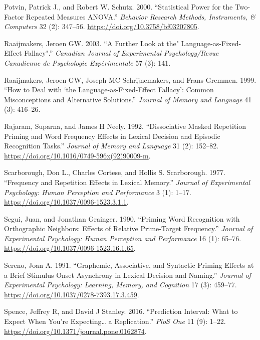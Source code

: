 \documentclass[
]{interact}
\newlength{\cslhangindent}
\newenvironment{CSLReferences}[2] %
 {\begin{list}{}{%
  \setlength{\itemindent}{0pt}
  \setlength{\leftmargin}{0pt}
  \setlength{\parsep}{0pt}
  \ifodd #1
   \setlength{\leftmargin}{\cslhangindent}
   \setlength{\itemindent}{-1\cslhangindent}
  \fi
  \setlength{\itemsep}{#2\baselineskip}}}
 {\end{list}}
\begin{document}
\begin{CSLReferences}{1}{0}
Potvin, Patrick J., and Robert W. Schutz. 2000. {``Statistical Power for
the Two-Factor Repeated Measures ANOVA.''} \emph{Behavior Research
Methods, Instruments, \& Computers} 32 (2): 347--56.
\url{https://doi.org/10.3758/bf03207805}.

Raaijmakers, Jeroen GW. 2003. {``A Further Look at the"
Language-as-Fixed-Effect Fallacy".''} \emph{Canadian Journal of
Experimental Psychology/Revue Canadienne de Psychologie Exp{é}rimentale}
57 (3): 141.

Raaijmakers, Jeroen GW, Joseph MC Schrijnemakers, and Frans Gremmen.
1999. {``How to Deal with {`the Language-as-Fixed-Effect Fallacy'}:
Common Misconceptions and Alternative Solutions.''} \emph{Journal of
Memory and Language} 41 (3): 416--26.

Rajaram, Suparna, and James H Neely. 1992. {``Dissociative Masked
Repetition Priming and Word Frequency Effects in Lexical Decision and
Episodic Recognition Tasks.''} \emph{Journal of Memory and Language} 31
(2): 152--82. \url{https://doi.org/10.1016/0749-596x(92)90009-m}.

Scarborough, Don L., Charles Cortese, and Hollis S. Scarborough. 1977.
{``Frequency and Repetition Effects in Lexical Memory.''} \emph{Journal
of Experimental Psychology: Human Perception and Performance} 3 (1):
1--17. \url{https://doi.org/10.1037/0096-1523.3.1.1}.

Segui, Juan, and Jonathan Grainger. 1990. {``Priming Word Recognition
with Orthographic Neighbors: Effects of Relative Prime-Target
Frequency.''} \emph{Journal of Experimental Psychology: Human Perception
and Performance} 16 (1): 65--76.
\url{https://doi.org/10.1037/0096-1523.16.1.65}.

Sereno, Joan A. 1991. {``Graphemic, Associative, and Syntactic Priming
Effects at a Brief Stimulus Onset Asynchrony in Lexical Decision and
Naming.''} \emph{Journal of Experimental Psychology: Learning, Memory,
and Cognition} 17 (3): 459--77.
\url{https://doi.org/10.1037/0278-7393.17.3.459}.

Spence, Jeffrey R, and David J Stanley. 2016. {``Prediction Interval:
What to Expect When You're Expecting\ldots{} a Replication.''}
\emph{PloS One} 11 (9): 1--22.
\url{https://doi.org/10.1371/journal.pone.0162874}.


\end{CSLReferences}
\end{document}

